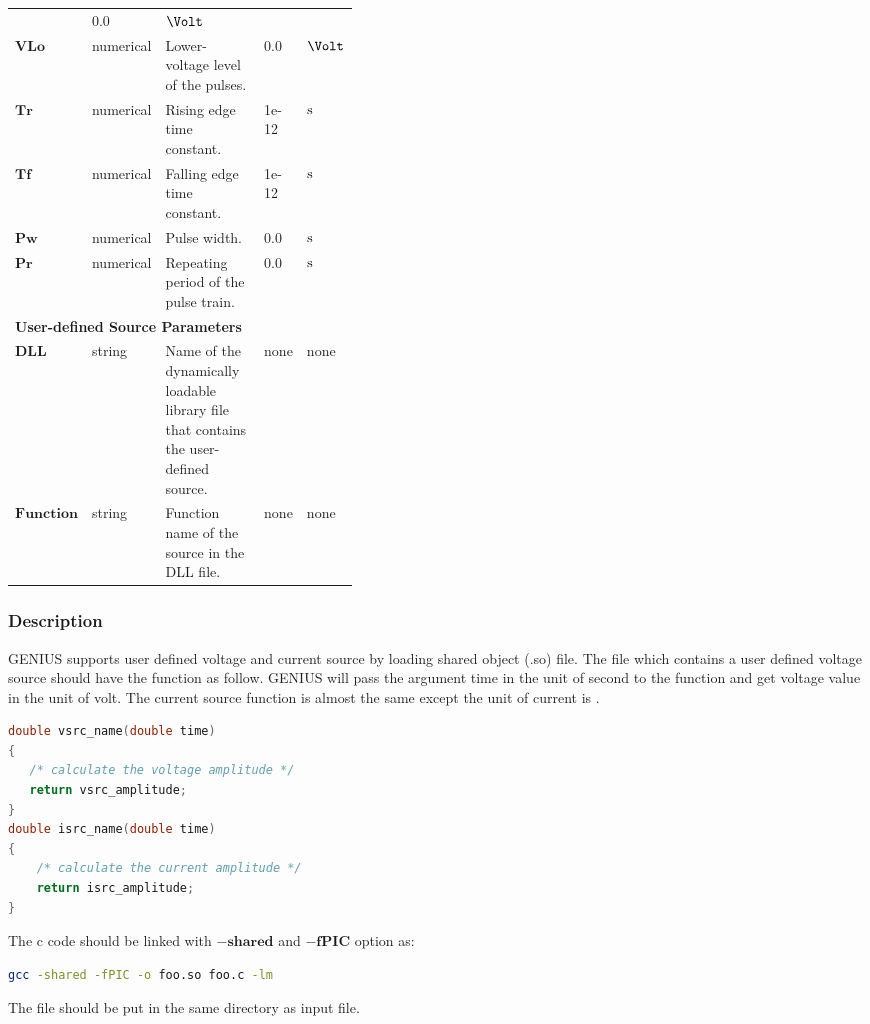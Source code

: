 \documentclass[oneside,12pt]{cgd_book}
\begin{document}
\begin{longtable}{ll>{\raggedright}p{0.4\linewidth}ll}
& 0.0
& $\Volt$
\\
 $\mathbf{VLo}$
& numerical
& Lower-voltage level of the pulses.
& 0.0
& $\Volt$
\\
 $\mathbf{Tr}$
& numerical
& Rising edge time constant.
& 1e-12
& $\text{s}$
\\
 $\mathbf{Tf}$
& numerical
& Falling edge time constant.
& 1e-12
& $\text{s}$
\\
 $\mathbf{Pw}$
& numerical
& Pulse width.
& 0.0
& $\text{s}$
\\
 $\mathbf{Pr}$
& numerical
& Repeating period of the pulse train.
& 0.0
& $\text{s}$\\
\multicolumn{5}{l}{\textbf{User-defined Source Parameters}}
\\
 $\mathbf{DLL}$
& string
& Name of the dynamically loadable library file that contains the user-defined source.
& none
& none
\\
 $\mathbf{Function}$
& string
& Function name of the source in the DLL file.
& none
& none\\
\end{longtable}

\subsubsection{Description}
GENIUS supports user defined voltage and current source by loading shared object (.so) file. The file
          which contains a user defined voltage source should have the function as follow. GENIUS will pass the argument
          time in the unit of second to the function 
and get voltage value in the unit of
          volt. The current source function is almost the same except the unit of current is
\Ampere.
\par
\begin{lstlisting}[language={C++}]
double vsrc_name(double time)
{
   /* calculate the voltage amplitude */
   return vsrc_amplitude;
}
double isrc_name(double time)
{
    /* calculate the current amplitude */
    return isrc_amplitude;
}
\end{lstlisting}
The c code should be linked with $\mathbf{-shared}$ and $\mathbf{-fPIC}$
option
          as:
\par
\begin{lstlisting}[language=sh]
gcc -shared -fPIC -o foo.so foo.c -lm
\end{lstlisting}
The  file should be put in the same directory as input file.
\par
\end{document}
